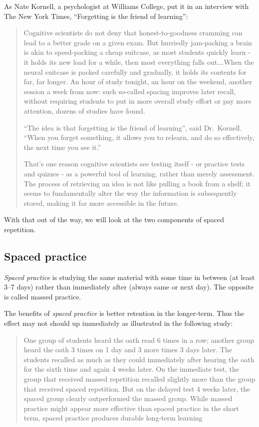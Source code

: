 As Nate Kornell, a psychologist at Williams College, put it in an
interview with The New York Times, ``Forgetting is the friend of
learning'':

\begin{quote}
Cognitive scientists do not deny that honest-to-goodness cramming can
lead to a better grade on a given exam. But hurriedly jam-packing a
brain is akin to speed-packing a cheap suitcase, as most students
quickly learn - it holds its new load for a while, then most everything
falls out\ldots{}.When the neural suitcase is packed carefully and
gradually, it holds its contents for far, far longer. An hour of study
tonight, an hour on the weekend, another session a week from now: such
so-called spacing improves later recall, without requiring students to
put in more overall study effort or pay more attention, dozens of
studies have found.

``The idea is that forgetting is the friend of learning'', said
Dr.~Kornell. ``When you forget something, it allows you to relearn, and
do so effectively, the next time you see it.''

That's one reason cognitive scientists see testing itself - or practice
tests and quizzes - as a powerful tool of learning, rather than merely
assessment. The process of retrieving an idea is not like pulling a book
from a shelf; it seems to fundamentally alter the way the information is
subsequently stored, making it far more accessible in the future.
\end{quote}

With that out of the way, we will look at the two components of spaced
repetition.

\hypertarget{spaced-practice}{\subsection{Spaced
practice}\label{spaced-practice}}

\emph{Spaced practice} is studying the same material with some time in
between (at least 3--7 days) rather than immediately after (always same
or next day). The opposite is called massed practice.

The benefits of \emph{spaced practice} is better retention in the
longer-term. Thus the effect may not should up immediately as
illustrated in the following study:

\begin{quote}
One group of students heard the oath read 6 times in a row; another
group heard the oath 3 times on 1 day and 3 more times 3 days later. The
students recalled as much as they could immediately after hearing the
oath for the sixth time and again 4 weeks later. On the immediate test,
the group that received massed repetition recalled slightly more than
the group that received spaced repetition. But on the delayed test 4
weeks later, the spaced group clearly outperformed the massed group.
While massed practice might appear more effective than spaced practice
in the short term, spaced practice produces durable long-term learning
\end{quote}

